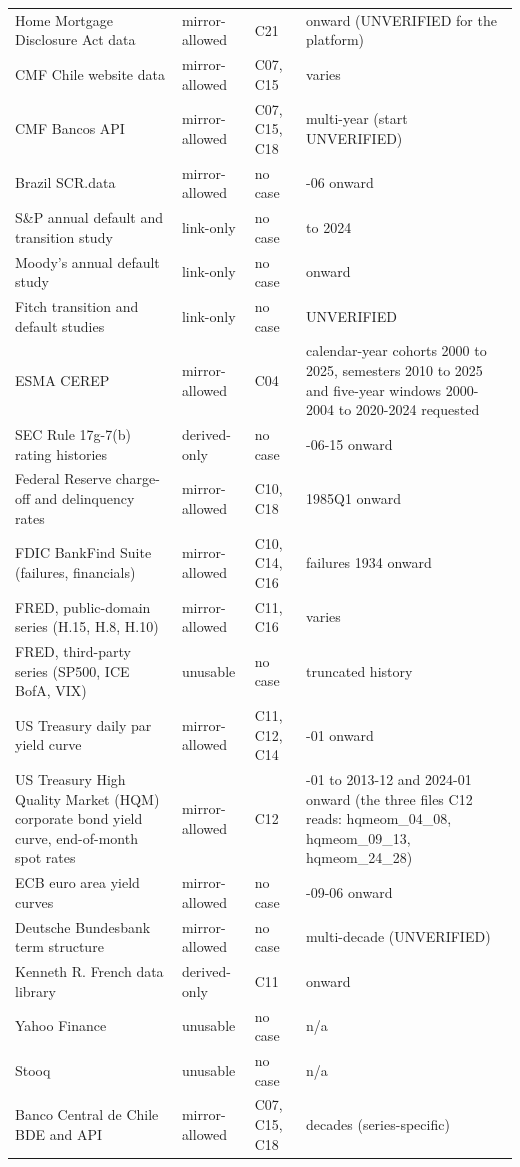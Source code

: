 {\begin{longtable}{>{\raggedright\arraybackslash}p{6.4cm}>{\raggedright\arraybackslash}p{2.2cm}>{\raggedright\arraybackslash}p{2.8cm}>{\raggedright\arraybackslash}p{3.0cm}}
Home Mortgage Disclosure Act data & mirror-allowed & C21 & 2007 onward (UNVERIFIED for the platform) \\
CMF Chile website data & mirror-allowed & C07, C15 & varies \\
CMF Bancos API & mirror-allowed & C07, C15, C18 & multi-year (start UNVERIFIED) \\
Brazil SCR.data & mirror-allowed & no case & 2012-06 onward \\
S\&P annual default and transition study & link-only & no case & 1981 to 2024 \\
Moody's annual default study & link-only & no case & 1920 onward \\
Fitch transition and default studies & link-only & no case & UNVERIFIED \\
ESMA CEREP & mirror-allowed & C04 & calendar-year cohorts 2000 to 2025, semesters 2010 to 2025 and five-year windows 2000-2004 to 2020-2024 requested \\
SEC Rule 17g-7(b) rating histories & derived-only & no case & 2012-06-15 onward \\
Federal Reserve charge-off and delinquency rates & mirror-allowed & C10, C18 & 1985Q1 onward \\
FDIC BankFind Suite (failures, financials) & mirror-allowed & C10, C14, C16 & failures 1934 onward \\
FRED, public-domain series (H.15, H.8, H.10) & mirror-allowed & C11, C16 & varies \\
FRED, third-party series (SP500, ICE BofA, VIX) & unusable & no case & truncated history \\
US Treasury daily par yield curve & mirror-allowed & C11, C12, C14 & 1990-01 onward \\
US Treasury High Quality Market (HQM) corporate bond yield curve, end-of-month spot rates & mirror-allowed & C12 & 2004-01 to 2013-12 and 2024-01 onward (the three files C12 reads: hqmeom\_04\_08, hqmeom\_09\_13, hqmeom\_24\_28) \\
ECB euro area yield curves & mirror-allowed & no case & 2004-09-06 onward \\
Deutsche Bundesbank term structure & mirror-allowed & no case & multi-decade (UNVERIFIED) \\
Kenneth R. French data library & derived-only & C11 & 1926 onward \\
Yahoo Finance & unusable & no case & n/a \\
Stooq & unusable & no case & n/a \\
Banco Central de Chile BDE and API & mirror-allowed & C07, C15, C18 & decades (series-specific) \\

\end{longtable}}
